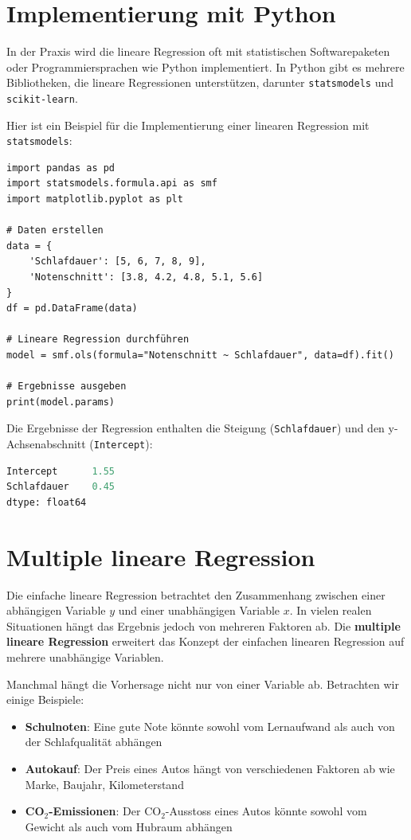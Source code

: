 \section{Implementierung mit Python}

In der Praxis wird die lineare Regression oft mit statistischen Softwarepaketen oder Programmiersprachen wie Python implementiert. In Python gibt es mehrere Bibliotheken, die lineare Regressionen unterstützen, darunter \texttt{statsmodels} und \texttt{scikit-learn}.

Hier ist ein Beispiel für die Implementierung einer linearen Regression mit \texttt{statsmodels}:

\begin{lstlisting}
import pandas as pd
import statsmodels.formula.api as smf
import matplotlib.pyplot as plt

# Daten erstellen
data = {
    'Schlafdauer': [5, 6, 7, 8, 9],
    'Notenschnitt': [3.8, 4.2, 4.8, 5.1, 5.6]
}
df = pd.DataFrame(data)

# Lineare Regression durchführen
model = smf.ols(formula="Notenschnitt ~ Schlafdauer", data=df).fit()

# Ergebnisse ausgeben
print(model.params)
\end{lstlisting}

Die Ergebnisse der Regression enthalten die Steigung (\texttt{Schlafdauer}) und den y-Achsenabschnitt (\texttt{Intercept}):

\begin{lstlisting}[language=Python]
Intercept      1.55
Schlafdauer    0.45
dtype: float64
\end{lstlisting}

\section{Multiple lineare Regression}

Die einfache lineare Regression betrachtet den Zusammenhang zwischen einer abhängigen Variable $y$ und einer unabhängigen Variable $x$. In vielen realen Situationen hängt das Ergebnis jedoch von mehreren Faktoren ab. Die \textbf{multiple lineare Regression} erweitert das Konzept der einfachen linearen Regression auf mehrere unabhängige Variablen.

Manchmal hängt die Vorhersage nicht nur von einer Variable ab. Betrachten wir einige Beispiele:

\begin{itemize}
	\item \textbf{Schulnoten}: Eine gute Note könnte sowohl vom Lernaufwand als auch von der Schlafqualität abhängen
	\item \textbf{Autokauf}: Der Preis eines Autos hängt von verschiedenen Faktoren ab wie Marke, Baujahr, Kilometerstand
	\item \textbf{CO$_2$-Emissionen}: Der CO$_2$-Ausstoss eines Autos könnte sowohl vom Gewicht als auch vom Hubraum abhängen
\end{itemize}

